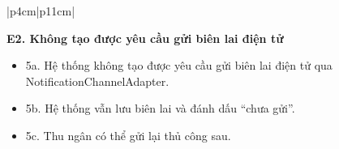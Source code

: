 \begin{longtable}{|p{4cm}|p{11cm}|}
\begin{minipage}[t]{\linewidth}
\vspace{0.3mm}

\textbf{E2. Không tạo được yêu cầu gửi biên lai điện tử}
\begin{itemize}
\item 5a. Hệ thống không tạo được yêu cầu gửi biên lai điện tử qua \textsf{NotificationChannelAdapter}.
\item 5b. Hệ thống vẫn lưu biên lai và đánh dấu “chưa gửi”.
\item 5c. Thu ngân có thể gửi lại thủ công sau.
\end{itemize}

\vspace{0.3mm}
\end{minipage}
\\ \hline

\end{longtable}

